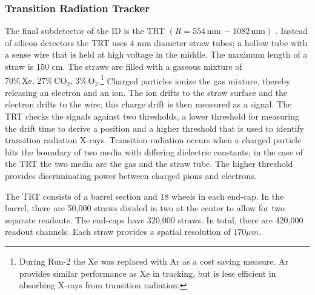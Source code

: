 		\subsubsection{Transition Radiation Tracker}\label{sssec:TRT}
			The final subdetector of the \gls{ID} is the \gls{TRT} $(R=554 \, \mathrm{mm} \, - 1082 \, \mathrm{mm})$ . Instead of silicon detectors the \gls{TRT} uses 4 mm diameter straw tubes; a hollow tube with a sense wire that is held at high voltage in the middle. The maximum length of a straw is 150 cm. The straws are filled with a gaseous mixture of $70\% \, \mathrm{Xe,} \, 27\% \, \mathrm{CO}_2, \, 3\% \, \mathrm{O}_2$.\footnote{During Run-2 the Xe was replaced with Ar as a cost saving measure. Ar provides similar performance as Xe in tracking, but is less efficient in absorbing X-rays from transition radiation.} Charged particles ionize the gas mixture, thereby releasing an electron and an ion. The ion drifts to the straw surface and the electron drifts to the wire; this charge drift is then measured as a signal. The \gls{TRT} checks the signals against two thresholds, a lower threshold for measuring the drift time to derive a position and a higher threshold that is used to identify transition radiation X-rays. Transition radiation occurs when a charged particle hits the boundary of two media with differing dielectric constants; in the case of the \gls{TRT} the two media are the gas and the straw tube. The higher threshold provides discriminating power between charged pions and electrons.

			The \gls{TRT} consists of a barrel section and 18 wheels in each end-cap. In the barrel, there are 50,000 straws divided in two at the center to allow for two separate readouts. The end-caps have 320,000 straws. In total, there are 420,000 readout channels. Each straw provides a spatial resolution of $170 \mu m$. \cite{ATLAS-ID}

